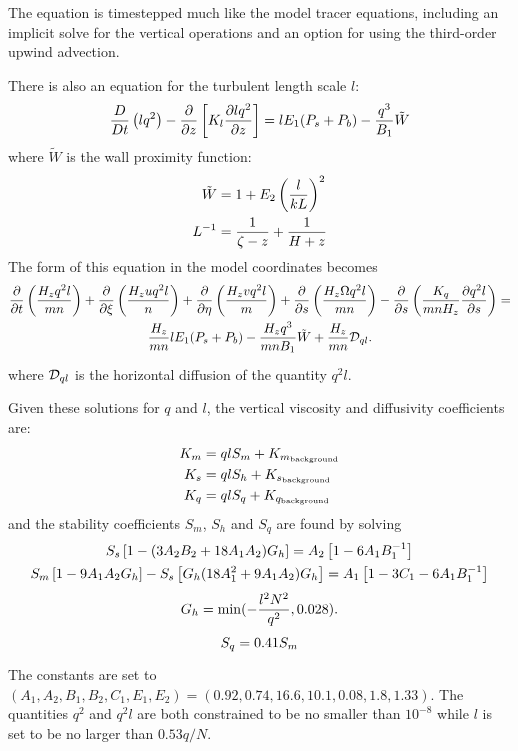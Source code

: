 The equation is timestepped much like the model tracer equations,
including an implicit solve for the vertical operations and an option
for using the third-order upwind advection.

There is also an equation for the turbulent length scale $l$:
\begin{equation}
  {D \over Dt} \left( {lq^2} \right) -
  {\partial \over \partial z} \left[ K_l
  {\partial lq^2 \over \partial z} 
  \right] = lE_1 ( P_s + P_b ) - {q^3 \over B_1} \tilde{W}
\end{equation}
where $\tilde{W}$ is the wall proximity function:
\begin{align}
  \tilde{W} &= 1 + E_2 \left( {l \over kL} \right) ^2 \\
  L^{-1} &= {1 \over \zeta -z} + {1 \over H+z}
\end{align}
The form of this equation in the model coordinates becomes
\begin{multline}
  {\partial \over \partial t} \left( {H_z q^2l \over mn} \right) +
  {\partial \over \partial \xi} \left( {H_z u q^2l \over n} \right) +
  {\partial \over \partial \eta} \left( {H_z v q^2l \over m} \right) +
  {\partial \over \partial s} \left( {H_z \Omega q^2l \over mn} \right) -
  {\partial \over \partial s} \left( {K_q \over mnH_z}
  {\partial q^2l \over \partial s} \right) =
\\ \vspace{1mm}
  {H_z \over mn} lE_1 ( P_s + P_b) - 
  {H_z q^3 \over mnB_1 } \tilde{W} +
  {H_z \over mn} {\cal D}_{ql} .
\end{multline}
where ${\cal D}_{ql}$ is the horizontal diffusion of the quantity
$q^2l$.

Given these solutions for $q$ and $l$, the vertical viscosity and
diffusivity coefficients are:
\begin{align}
  K_m &= qlS_m + K_{m_{\rm background}} \\
  K_s &= qlS_h + K_{s_{\rm background}} \\
  K_q &= qlS_q + K_{q_{\rm background}}
\end{align}
and the stability coefficients $S_m$, $S_h$ and $S_q$ are found by
solving
\begin{gather}
  S_s \left[ 1 - (3A_2 B_2 + 18 A_1 A_2) G_h \right] =
  A_2 \left[ 1 - 6A_1 B_1^{-1} \right]
\\ \vspace{1mm}
  S_m \left[ 1 - 9A_1 A_2 G_h \right] - S_s \left[ G_h ( 18 A_1^2 +
  9A_1 A_2 ) G_h \right] =
  A_1 \left[ 1 - 3C_1 - 6A_1 B_1^{-1} \right]
\\ \vspace{1mm}
  G_h = \min ( -{l^2N^2 \over q^2}, 0.028 ).
\\ \vspace{1mm}
  S_q = 0.41 S_m
\end{gather}
The constants are set to $(A_1, A_2, B_1, B_2, C_1, E_1, E_2) = 
(0.92, 0.74, 16.6, 10.1, 0.08, 1.8, 1.33)$. The quantities $q^2$ and
$q^2l$ are both constrained to be no smaller than $10^{-8}$ while $l$
is set to be no larger than $0.53q/N$.
    
